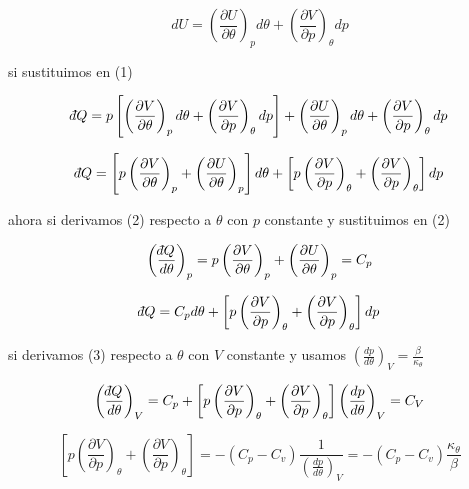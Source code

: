 \documentclass[12pt,a4paper]{article}
\newcommand{\dbar}{\mathchar'26\mkern-12mu d}
\begin{document}
\begin{enumerate}
    \begin{equation*}
        dU = \left(\frac{\partial U}{\partial \theta}\right)_p d\theta + \left(\frac{\partial V}{\partial p}\right)_\theta dp
    \end{equation*}
    
    si sustituimos en (1)
    
    \begin{equation*}
        \dbar Q = p \left[\left(\frac{\partial V}{\partial \theta}\right)_p d\theta + \left(\frac{\partial V}{\partial p}\right)_\theta dp \right] + \left(\frac{\partial U}{\partial \theta}\right)_p d\theta + \left(\frac{\partial V}{\partial p}\right)_\theta dp
    \end{equation*}
    
    \begin{equation}
        \dbar Q = \left[p\left(\frac{\partial V}{\partial \theta}\right)_p + \left(\frac{\partial U}{\partial \theta}\right)_p \right] d\theta + \left[p\left(\frac{\partial V}{\partial p}\right)_\theta + \left(\frac{\partial V}{\partial p}\right)_\theta\right] dp
    \end{equation}
    
    ahora si derivamos (2) respecto a $\theta$ con $p$ constante y sustituimos en (2)
    
    \begin{equation*}
        \left(\frac{\dbar Q}{d \theta}\right)_p = p\left(\frac{\partial V}{\partial \theta}\right)_p + \left(\frac{\partial U}{\partial \theta}\right)_p = C_p
    \end{equation*}
    
    \begin{equation}
        \dbar Q = C_p d\theta + \left[p\left(\frac{\partial V}{\partial p}\right)_\theta + \left(\frac{\partial V}{\partial p}\right)_\theta\right] dp
    \end{equation}
    
    si derivamos (3) respecto a $\theta$ con $V$ constante y usamos $\left(\frac{dp}{d\theta}\right)_V = \frac{\beta}{\kappa_\theta}$
    
    \begin{equation*}
        \left(\frac{\dbar Q}{d \theta}\right)_V = C_p + \left[p\left(\frac{\partial V}{\partial p}\right)_\theta + \left(\frac{\partial V}{\partial p}\right)_\theta\right] \left(\frac{dp}{d\theta}\right)_V = C_V 
    \end{equation*}
    
    \begin{equation*}
        \left[p\left(\frac{\partial V}{\partial p}\right)_\theta + \left(\frac{\partial V}{\partial p}\right)_\theta\right] = -(C_p - C_v) \frac{1}{\left(\frac{dp}{d\theta}\right)_V}= -(C_p - C_v) \frac{\kappa_\theta}{\beta}
    \end{equation*}
    

\end{enumerate}
\end{document}
